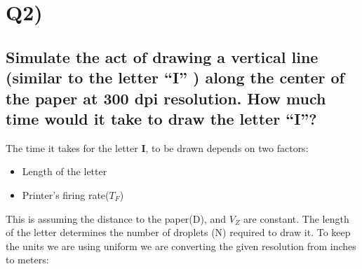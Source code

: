 \documentclass[a4paper]{article}
\begin{document}
\section*{Q2)}
\subsection*{Simulate the act of drawing a vertical line (similar to the letter “I” ) along the center of the paper at 300 dpi resolution. How much time would it take to draw the letter “I”?}

The time it takes for the letter \textbf{I}, to be drawn depends on two factors:
\begin{itemize}
    \item Length of the letter
    \item Printer's firing rate($T_F$)
\end{itemize}
This is assuming the distance to the paper(D), and $V_Z$ are constant. The length of the letter determines the number of droplets (N) required to draw it. To keep the units we are using uniform we are converting the given resolution from inches to meters:
\end{document}
